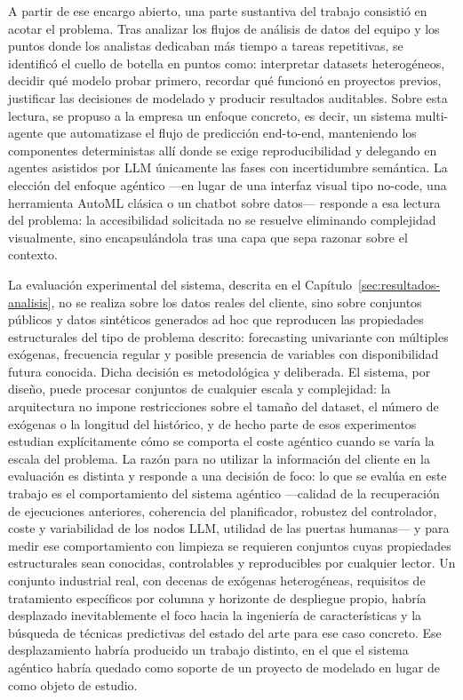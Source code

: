 \documentclass[12pt,a4paper]{article}
\theoremstyle{plain}
\begin{document}
A partir de ese encargo abierto, una parte sustantiva del trabajo consistió en acotar el problema. Tras analizar los flujos de análisis de datos del equipo y los puntos donde los analistas dedicaban más tiempo a tareas repetitivas, se identificó el cuello de botella en puntos como: interpretar datasets heterogéneos, decidir qué modelo probar primero, recordar qué funcionó en proyectos previos, justificar las decisiones de modelado y producir resultados auditables. Sobre esta lectura, se propuso a la empresa un enfoque concreto, es decir, un sistema multi-agente que automatizase el flujo de predicción end-to-end, manteniendo los componentes deterministas allí donde se exige reproducibilidad y delegando en agentes asistidos por LLM únicamente las fases con incertidumbre semántica. La elección del enfoque agéntico ---en lugar de una interfaz visual tipo no-code, una herramienta AutoML clásica o un chatbot sobre datos--- responde a esa lectura del problema: la accesibilidad solicitada no se resuelve eliminando complejidad visualmente, sino encapsulándola tras una capa que sepa razonar sobre el contexto.

La evaluación experimental del sistema, descrita en el Capítulo~\ref{sec:resultados-analisis}, no se realiza sobre los datos reales del cliente, sino sobre conjuntos públicos y datos sintéticos generados ad hoc que reproducen las propiedades estructurales del tipo de problema descrito: forecasting univariante con múltiples exógenas, frecuencia regular y posible presencia de variables con disponibilidad futura conocida. Dicha decisión es metodológica y deliberada. El sistema, por diseño, puede procesar conjuntos de cualquier escala y complejidad: la arquitectura no impone restricciones sobre el tamaño del dataset, el número de exógenas o la longitud del histórico, y de hecho parte de esos experimentos estudian explícitamente cómo se comporta el coste agéntico cuando se varía la escala del problema. La razón para no utilizar la información del cliente en la evaluación es distinta y responde a una decisión de foco: lo que se evalúa en este trabajo es el comportamiento del sistema agéntico ---calidad de la recuperación de ejecuciones anteriores, coherencia del planificador, robustez del controlador, coste y variabilidad de los nodos LLM, utilidad de las puertas humanas--- y para medir ese comportamiento con limpieza se requieren conjuntos cuyas propiedades estructurales sean conocidas, controlables y reproducibles por cualquier lector. Un conjunto industrial real, con decenas de exógenas heterogéneas, requisitos de tratamiento específicos por columna y horizonte de despliegue propio, habría desplazado inevitablemente el foco hacia la ingeniería de características y la búsqueda de técnicas predictivas del estado del arte para ese caso concreto. Ese desplazamiento habría producido un trabajo distinto, en el que el sistema agéntico habría quedado como soporte de un proyecto de modelado en lugar de como objeto de estudio. %
\end{document}
